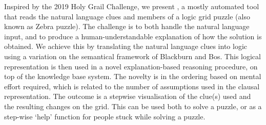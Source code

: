 Inspired by the 2019 Holy Grail Challenge, we present \ourtool, a mostly automated tool that reads the natural language clues and members  of a logic grid puzzle (also known as Zebra puzzle). The challenge is to both handle the natural language input, and to produce a human-understandable explanation of how the solution is obtained.
We achieve this by translating the natural language clues into logic using a variation on the semantical framework of Blackburn and Bos. This logical representation is then used in a novel explanation-based reasoning procedure, on top of the \idp knowledge base system. The novelty is in the ordering based on mental effort required, which is related to the number of assumptions used in the clausal representation. The outcome is a stepwise visualisation of the clue(s) used and the resulting changes on the grid.
This can be used both to solve a puzzle, or as a step-wise `help' function for people stuck while solving a puzzle.


